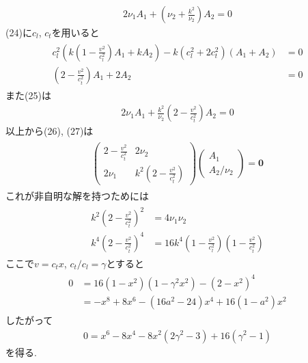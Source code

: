 \documentclass[uplatex,a4j,11pt,dvipdfmx]{jsarticle}
\begin{document}
\begin{align}
  2\nu_1A_1+\left(\nu_2+\frac{k^2}{\nu_2}\right)A_2=0
\end{align}
(24)に$c_l$, $c_t$を用いると
\begin{align}
  \begin{split}
    c_l^2\left(k\left(1-\frac{v^2}{c_l^2}\right)A_1+kA_2\right)-k(c_l^2+2c_t^2)(A_1+A_2)&=0\\
    (2-\frac{v^2}{c_t^2})A_1+2A_2&=0
  \end{split}
\end{align}
また(25)は
\begin{align}
  2\nu_1A_1+\frac{k^2}{\nu_2}\left(2-\frac{v^2}{c_t^2}\right)A_2=0
\end{align}
以上から(26), (27)は
\begin{align}
  \begin{split}
    \left(
      \begin{array}{cc}
        2-\frac{v^2}{c_t^2}&2\nu_2\\
        2\nu_1&k^2\left(2-\frac{v^2}{c_t^2}\right)
      \end{array}
    \right)\left(
      \begin{array}{c}
        A_1\\A_2/\nu_2
      \end{array}
    \right)={\bm 0}
  \end{split}
\end{align}
これが非自明な解を持つためには
\begin{align}
  \begin{split}
    k^2\left(2-\frac{v^2}{c_t^2}\right)^2&=4\nu_1\nu_2\\
    k^4\left(2-\frac{v^2}{c_t^2}\right)^4&=16k^4\left(1-\frac{v^2}{c_l^2}\right)\left(1-\frac{v^2}{c_t^2}\right)
  \end{split}
\end{align}
ここで$v=c_tx$, $c_t/c_l=\gamma$とすると
\begin{align}
  \begin{split}
    0&=16(1-x^2)(1-\gamma^2x^2)-(2-x^2)^4\\
    &=-x^8+8x^6-(16a^2-24)x^4+16(1-a^2)x^2
  \end{split}
\end{align}
したがって
\begin{align}
  0=x^6-8x^4-8x^2(2\gamma^2-3)+16(\gamma^2-1)
\end{align}
を得る.\cite{tohoku:online}
\end{document}

